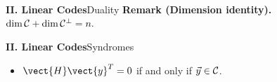 \begin{frame}{\textbf{II. Linear Codes}}{Duality}
\small
{}
\textbf{Remark (Dimension identity).}\; $ \dim\mathcal{C}+\dim\mathcal{C}^\perp=n.$
\end{frame}


\begin{frame}{\textbf{II. Linear Codes}}{Syndromes}
\small
{}
\begin{itemize}
  \item $\vect{H}\vect{y}^T=0$ if and only if $\vec{y}\in\mathcal{C}$.
\end{itemize}
\end{frame}


